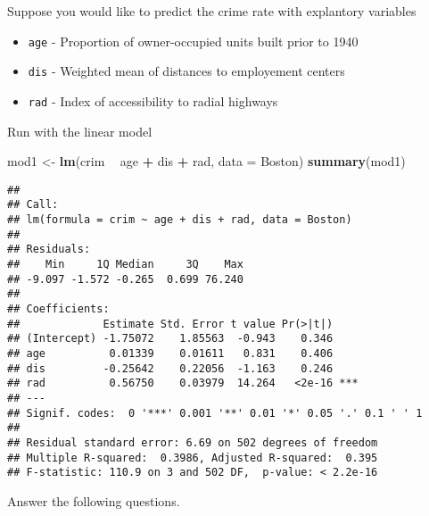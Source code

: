 \documentclass[
]{article}
\newenvironment{Shaded}{\begin{snugshade}}{\end{snugshade}}
\newcommand{\DataTypeTok}[1]{\textcolor[rgb]{0.13,0.29,0.53}{#1}}
\newcommand{\KeywordTok}[1]{\textcolor[rgb]{0.13,0.29,0.53}{\textbf{#1}}}
\newcommand{\NormalTok}[1]{#1}
\newcommand{\OperatorTok}[1]{\textcolor[rgb]{0.81,0.36,0.00}{\textbf{#1}}}
\newcommand{\StringTok}[1]{\textcolor[rgb]{0.31,0.60,0.02}{#1}}
\providecommand{\tightlist}{%
  \setlength{\itemsep}{0pt}\setlength{\parskip}{0pt}}
\begin{document}
Suppose you would like to predict the crime rate with explantory
variables

\begin{itemize}
\tightlist
\item
  \texttt{age} - Proportion of owner-occupied units built prior to 1940
\item
  \texttt{dis} - Weighted mean of distances to employement centers
\item
  \texttt{rad} - Index of accessibility to radial highways
\end{itemize}

Run with the linear model

\begin{Shaded}
\begin{Highlighting}[]
\NormalTok{mod1 <-}\StringTok{ }\KeywordTok{lm}\NormalTok{(crim }\OperatorTok{~}\StringTok{ }\NormalTok{age }\OperatorTok{+}\StringTok{ }\NormalTok{dis }\OperatorTok{+}\StringTok{ }\NormalTok{rad, }\DataTypeTok{data =}\NormalTok{ Boston)}
\KeywordTok{summary}\NormalTok{(mod1)}
\end{Highlighting}
\end{Shaded}

\begin{verbatim}
## 
## Call:
## lm(formula = crim ~ age + dis + rad, data = Boston)
## 
## Residuals:
##    Min     1Q Median     3Q    Max 
## -9.097 -1.572 -0.265  0.699 76.240 
## 
## Coefficients:
##             Estimate Std. Error t value Pr(>|t|)    
## (Intercept) -1.75072    1.85563  -0.943    0.346    
## age          0.01339    0.01611   0.831    0.406    
## dis         -0.25642    0.22056  -1.163    0.246    
## rad          0.56750    0.03979  14.264   <2e-16 ***
## ---
## Signif. codes:  0 '***' 0.001 '**' 0.01 '*' 0.05 '.' 0.1 ' ' 1
## 
## Residual standard error: 6.69 on 502 degrees of freedom
## Multiple R-squared:  0.3986, Adjusted R-squared:  0.395 
## F-statistic: 110.9 on 3 and 502 DF,  p-value: < 2.2e-16
\end{verbatim}

Answer the following questions.
\end{document}
